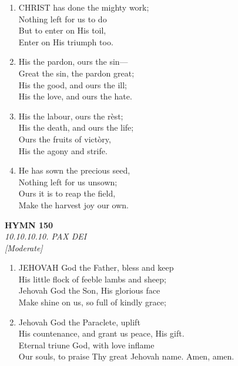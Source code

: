 \documentclass[11pt,a4paper]{article}
\begin{document}
\begin{enumerate}
    \item CHRIST has done the mighty work; \\
        Nothing left for us to do \\
        But to enter on His toil, \\
        Enter on His triumph too.

    \item His the pardon, ours the sin--- \\
        Great the sin, the pardon great; \\
        His the good, and ours the ill; \\
        His the love, and ours the hate.

    \item His the labour, ours the r\`est; \\
        His the death, and ours the life; \\
        Ours the fruits of vict\`ory, \\
        His the agony and strife.

    \item He has sown the precious seed, \\
        Nothing left for us unsown; \\
        Ours it is to reap the field, \\
        Make the harvest joy our own.

\end{enumerate}

\newpage
\begin{center}
    {\Large \textbf{HYMN 150}}
    \\
    \textit{10.10.10.10. PAX DEI}
    \\
    \textit{\small [Moderate]}
\end{center}
\vspace{1em}

\begin{enumerate}
    \item JEHOVAH God the Father, bless and keep \\
        His little flock of feeble lambs and sheep; \\
        Jehovah God the Son, His glorious face \\
        Make shine on us, so full of kindly grace;

    \item Jehovah God the Paraclete, uplift \\
        His countenance, and grant us peace, His gift. \\
        Eternal triune God, with love inflame \\
        Our souls, to praise Thy great Jehovah name. Amen, amen.

\end{enumerate}
\end{document}
